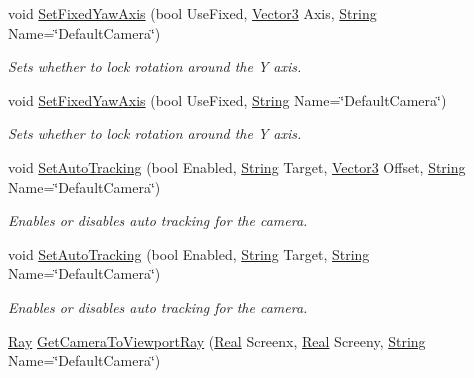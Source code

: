 \begin{DoxyCompactItemize}
void \hyperlink{classphys_1_1CameraManager_ac29a1b3cd34ff2810bee170aa233c77e}{SetFixedYawAxis} (bool UseFixed, \hyperlink{classphys_1_1Vector3}{Vector3} Axis, \hyperlink{namespacephys_aa03900411993de7fbfec4789bc1d392e}{String} Name=\char`\"{}DefaultCamera\char`\"{})
\begin{DoxyCompactList}\small\item\em Sets whether to lock rotation around the Y axis. \item\end{DoxyCompactList}\item 
void \hyperlink{classphys_1_1CameraManager_aa7370f2239e88ab151b72c4171afea07}{SetFixedYawAxis} (bool UseFixed, \hyperlink{namespacephys_aa03900411993de7fbfec4789bc1d392e}{String} Name=\char`\"{}DefaultCamera\char`\"{})
\begin{DoxyCompactList}\small\item\em Sets whether to lock rotation around the Y axis. \item\end{DoxyCompactList}\item 
void \hyperlink{classphys_1_1CameraManager_a43d55c71817096add5dad1552239fc74}{SetAutoTracking} (bool Enabled, \hyperlink{namespacephys_aa03900411993de7fbfec4789bc1d392e}{String} Target, \hyperlink{classphys_1_1Vector3}{Vector3} Offset, \hyperlink{namespacephys_aa03900411993de7fbfec4789bc1d392e}{String} Name=\char`\"{}DefaultCamera\char`\"{})
\begin{DoxyCompactList}\small\item\em Enables or disables auto tracking for the camera. \item\end{DoxyCompactList}\item 
void \hyperlink{classphys_1_1CameraManager_a6edd94b6e8d9f2fa1e0b84554b367933}{SetAutoTracking} (bool Enabled, \hyperlink{namespacephys_aa03900411993de7fbfec4789bc1d392e}{String} Target, \hyperlink{namespacephys_aa03900411993de7fbfec4789bc1d392e}{String} Name=\char`\"{}DefaultCamera\char`\"{})
\begin{DoxyCompactList}\small\item\em Enables or disables auto tracking for the camera. \item\end{DoxyCompactList}\item 
\hyperlink{classphys_1_1Ray}{Ray} \hyperlink{classphys_1_1CameraManager_a1a631eee22a0e45e2e72727d0bcc3560}{GetCameraToViewportRay} (\hyperlink{namespacephys_af7eb897198d265b8e868f45240230d5f}{Real} Screenx, \hyperlink{namespacephys_af7eb897198d265b8e868f45240230d5f}{Real} Screeny, \hyperlink{namespacephys_aa03900411993de7fbfec4789bc1d392e}{String} Name=\char`\"{}DefaultCamera\char`\"{})

\end{DoxyCompactItemize}
